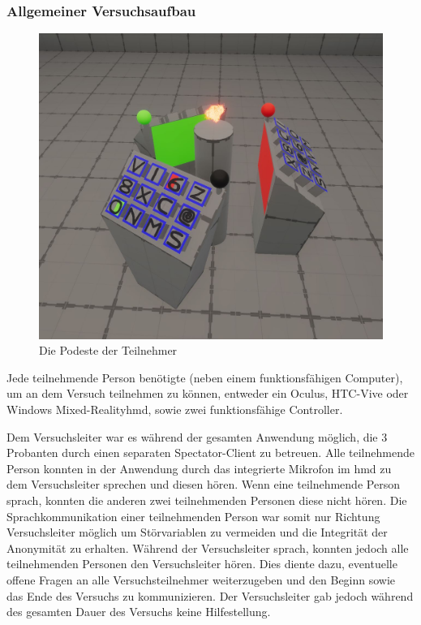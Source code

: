 \documentclass[a4paper,11pt]{article}%
\renewcommand{\\}{\vspace*{0.5\baselineskip} \newline}
\begin{document}
	\subsubsection{Allgemeiner Versuchsaufbau}

\begin{figure}[h]
		\begin{footnotesize}
			\includegraphics[width=\textwidth]{Abbildungen/Podeste.JPG}\\
			\caption[Abbildung 1]{Die Podeste der Teilnehmer}
			\label{Podeste}
		\end{footnotesize}
	\end{figure}

Jede teilnehmende Person benötigte (neben einem funktionsfähigen Computer), um an dem Versuch teilnehmen zu können, entweder ein Oculus, HTC-Vive oder Windows Mixed-Reality\ac{hmd}, sowie zwei funktionsfähige Controller.

Dem Versuchsleiter war es während der gesamten Anwendung möglich, die 3 Probanten durch einen separaten Spectator-Client zu betreuen. Alle teilnehmende Person konnten in der Anwendung durch das integrierte Mikrofon im \ac{hmd} zu dem Versuchsleiter sprechen und diesen hören. Wenn eine teilnehmende Person sprach, konnten die anderen zwei teilnehmenden Personen diese nicht hören. Die Sprachkommunikation einer teilnehmenden Person war somit nur Richtung Versuchsleiter möglich um Störvariablen zu vermeiden und die Integrität der Anonymität zu erhalten.
Während der Versuchsleiter sprach, konnten jedoch alle teilnehmenden Personen den Versuchsleiter hören. Dies diente dazu, eventuelle offene Fragen an alle Versuchsteilnehmer weiterzugeben und den Beginn sowie das Ende des Versuchs zu kommunizieren. Der Versuchsleiter gab jedoch während des gesamten Dauer des Versuchs keine Hilfestellung.
\end{document}
